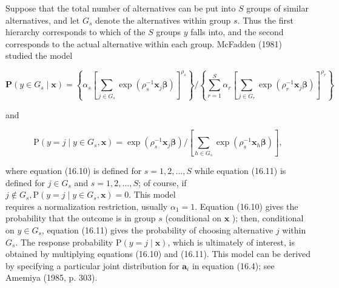 \documentclass[10pt]{article}
\begin{document}
Suppose that the total number of alternatives can be put into $S$ groups of similar alternatives, and let $G_{s}$ denote the alternatives within group $s$. Thus the first hierarchy corresponds to which of the $S$ groups $y$ falls into, and the second corresponds to the actual alternative within each group. McFadden (1981) studied the model


\begin{equation*}
\mathbf{P}\left(y \in G_{s} \mid \mathbf{x}\right)=\left\{\alpha_{s}\left[\sum_{j \in G_{s}} \exp \left(\rho_{s}^{-1} \mathbf{x}_{j} \boldsymbol{\beta}\right)\right]^{\rho_{s}}\right\} /\left\{\sum_{r=1}^{S} \alpha_{r}\left[\sum_{j \in G_{r}} \exp \left(\rho_{r}^{-1} \mathbf{x}_{j} \boldsymbol{\beta}\right)\right]^{\rho_{r}}\right\} \tag{16.10}
\end{equation*}


and


\begin{equation*}
\mathrm{P}\left(y=j \mid y \in G_{s}, \mathbf{x}\right)=\exp \left(\rho_{s}^{-1} \mathbf{x}_{j} \boldsymbol{\beta}\right) /\left[\sum_{h \in G_{s}} \exp \left(\rho_{s}^{-1} \mathbf{x}_{h} \boldsymbol{\beta}\right)\right], \tag{16.11}
\end{equation*}


where equation (16.10) is defined for $s=1,2, \ldots, S$ while equation (16.11) is defined for $j \in G_{s}$ and $s=1,2, \ldots, S$; of course, if $j \notin G_{s}, \mathrm{P}\left(y=j \mid y \in G_{s}, \mathbf{x}\right)=0$. This model\\
requires a normalization restriction, usually $\alpha_{1}=1$. Equation (16.10) gives the probability that the outcome is in group $s$ (conditional on $\mathbf{x}$ ); then, conditional on $y \in G_{s}$, equation (16.11) gives the probability of choosing alternative $j$ within $G_{s}$. The response probability $\mathrm{P}(y=j \mid \mathbf{x})$, which is ultimately of interest, is obtained by multiplying equations (16.10) and (16.11). This model can be derived by specifying a particular joint distribution for $\mathbf{a}_{i}$ in equation (16.4); see Amemiya (1985, p. 303).
\end{document}
